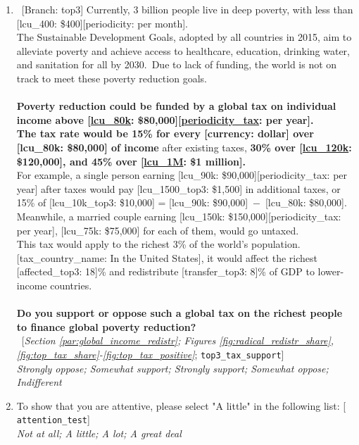 \begin{enumerate}[resume]
\item ~[Branch: top3] \label{q:top3_tax_support} Currently, 3 billion people live in deep poverty, with less than [lcu\_400: \$400][periodicity: per month].\\The Sustainable Development Goals, adopted by all countries in 2015, aim to alleviate poverty and achieve access to healthcare, education, drinking water, and sanitation for all by 2030.~Due to lack of funding, the world is not on track to meet these poverty reduction goals.\\\\\textbf{Poverty reduction could be funded by a global tax on individual income above [\hyperlink{tab_features}{lcu\_80k}: \$80,000][\hyperlink{tab_features}{periodicity\_tax}: per year].~\\The tax rate would be 15\% for every [currency: dollar] over [lcu\_80k: \$80,000] of income} after existing taxes, \textbf{30\% over [\hyperlink{tab_features}{lcu\_120k}: \$120,000], and 45\% over [\hyperlink{tab_features}{lcu\_1M}: \$1 million].~}\\For example, a single person earning [lcu\_90k: \$90,000][periodicity\_tax: per year] after taxes would pay [lcu\_1500\_top3: \$1,500] in additional taxes, or 15\% of [lcu\_10k\_top3: \$10,000] = [lcu\_90k: \$90,000]~$-$~[lcu\_80k: \$80,000]. Meanwhile, a married couple earning [lcu\_150k: \$150,000][periodicity\_tax: per year], [lcu\_75k: \$75,000] for each of them, would go untaxed.\\This tax would apply to the richest 3\% of the world's population. [tax\_country\_name: In the United States], it would affect the richest [affected\_top3: 18]\% and redistribute [transfer\_top3: 8]\% of GDP to lower-income countries.\\\\\textbf{Do you support or oppose such a global tax on the richest people to finance global poverty reduction?}\\ 
~[\textit{Section \ref{par:global_income_redistr}; Figures \ref{fig:radical_redistr_share}, \ref{fig:top_tax_share}-\ref{fig:top_tax_positive}}; 
\verb|top3_tax_support|]
  \\ \textit{Strongly oppose; Somewhat support; Strongly support; Somewhat oppose; Indifferent}

\item  \label{q:attention_test} To show that you are attentive, please select "A little" in the following list: [%
\verb|attention_test|]
  \\ \textit{Not at all; A little; A lot; A great deal}

\end{enumerate} 

